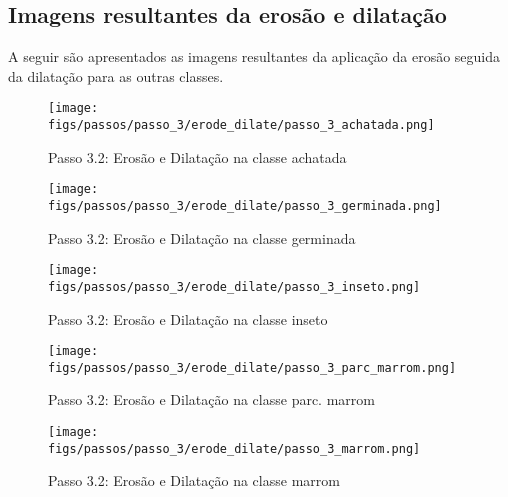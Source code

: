 
\begin{anexosenv}

\partanexos

\chapter{Imagens resultantes da erosão e dilatação}

A seguir são apresentados as imagens resultantes da aplicação da erosão seguida da dilatação para as outras classes.

\begin{figure}[hbtp!]
 \centering
 \caption{Passo 3.2: Erosão e Dilatação na classe achatada}
 \texttt{[image: figs/passos/passo\_3/erode\_dilate/passo\_3\_achatada.png]}
 \label{fig:passo_3.2_achatada}
\end{figure}

\begin{figure}[hbtp!]
 \centering
 \caption{Passo 3.2: Erosão e Dilatação na classe germinada}
 \texttt{[image: figs/passos/passo\_3/erode\_dilate/passo\_3\_germinada.png]}
 \label{fig:passo_3.2_germinada}
\end{figure}

\begin{figure}[hbtp!]
 \centering
 \caption{Passo 3.2: Erosão e Dilatação na classe inseto}
 \texttt{[image: figs/passos/passo\_3/erode\_dilate/passo\_3\_inseto.png]}
 \label{fig:passo_3.2_inseto}
\end{figure}

\begin{figure}[hbtp!]
 \centering
 \caption{Passo 3.2: Erosão e Dilatação na classe parc. marrom}
 \texttt{[image: figs/passos/passo\_3/erode\_dilate/passo\_3\_parc\_marrom.png]}
 \label{fig:passo_3.2_parc_marrom}
\end{figure}

\begin{figure}[hbtp!]
 \centering
 \caption{Passo 3.2: Erosão e Dilatação na classe marrom}
 \texttt{[image: figs/passos/passo\_3/erode\_dilate/passo\_3\_marrom.png]}
 \label{fig:passo_3.2_marrom}
\end{figure}


\end{anexosenv}
